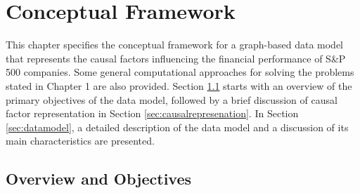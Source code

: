 \documentclass [
     12pt,         %
     a4paper,      %
     BCOR10mm,     %
     DIV14,        %
     liststotoc,   %
     bibtotoc,     %
     idxtotoc,     %
     parskip       %
     ]{scrreprt}
\begin{document}
%

%

%

%
\newpage


\tableofcontents
\cleardoublepage
{} 






\chapter{Conceptual Framework} \label{conceptualization}

This chapter specifies the conceptual framework for a graph-based data model that represents the causal factors influencing the financial performance of S\&P 500 companies. Some general computational approaches for solving the problems stated in Chapter 1 are also provided. Section \ref{sec:overview} starts with an overview of the primary objectives of the data model, followed by a brief discussion of causal factor representation in Section \ref{sec:causalrepresenation}. In Section \ref{sec:datamodel}, a detailed description of the data model and a discussion of its main characteristics are presented. 


\section{Overview and Objectives} \label{sec:overview} 
\end{document}
